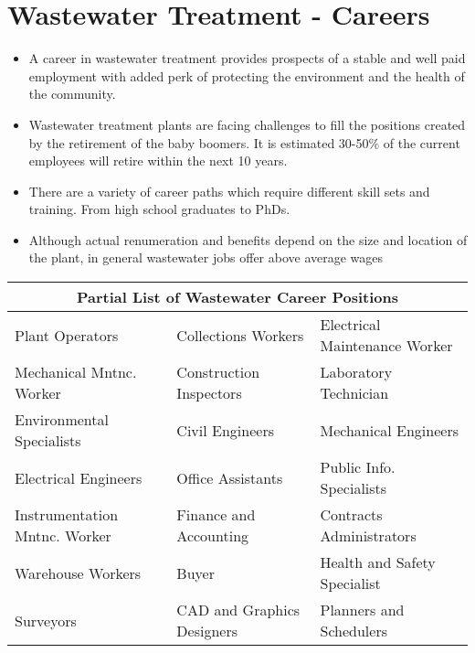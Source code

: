 \chapter{Wastewater Treatment - Careers}

\begin{itemize}
\item A career in wastewater treatment provides prospects of a stable and well paid employment with added perk of protecting the environment and the health of the community.
\item Wastewater treatment plants are facing challenges to fill the positions created by the retirement of the baby boomers.  It is estimated 30-50\% of the current employees will retire within the next 10 years.
\item There are a variety of career paths which require different skill sets and training. From high school graduates to PhDs.
\item Although actual renumeration and benefits depend on the size and location of the plant, in general wastewater jobs offer above average wages
\end{itemize}
\vspace{0.3cm}
\begin{tabular}{ |p{5cm}|p{5cm}|p{5cm}|  }
 \hline
 \multicolumn{3}{|c|}{Partial List of Wastewater Career Positions} \\
 \hline
 \hline
Plant Operators   & Collections Workers    &Electrical Maintenance Worker\\
Mechanical Mntnc. Worker   & Construction Inspectors   &Laboratory Technician\\
Environmental Specialists  & Civil Engineers & Mechanical Engineers\\
Electrical Engineers  & Office Assistants & Public Info. Specialists\\
Instrumentation Mntnc. Worker   & Finance and Accounting &Contracts Administrators\\
Warehouse Workers & Buyer & Health and Safety Specialist\\
Surveyors & CAD and Graphics Designers & Planners and Schedulers\\
 \hline
\end{tabular}\\



